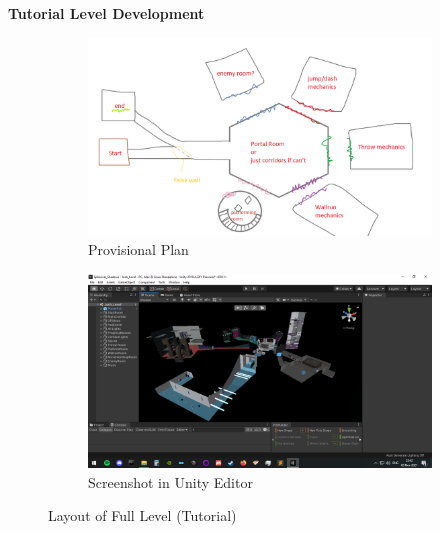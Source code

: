 \textbf{Tutorial Level Development}\\



\begin{figure}[H]
\centering
\begin{subfigure}{0.5\textwidth}
  \centering
  \includegraphics[width=1\linewidth]{Figures/fullplan.png}
  \caption{Provisional Plan}
\end{subfigure}%
\begin{subfigure}{0.5\textwidth}
  \centering
  \includegraphics[width=1\linewidth]{Figures/full.png}
  \caption{Screenshot in Unity Editor}
\end{subfigure}
\caption{Layout of Full Level (Tutorial)}
\end{figure}

